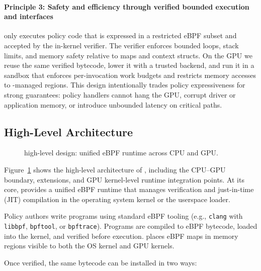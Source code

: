 \paragraph{Principle 3: Safety and efficiency through verified bounded execution and interfaces}
\sys only executes policy code that is expressed in a restricted eBPF subset and accepted by the in-kernel verifier. The verifier enforces bounded loops, stack limits, and memory safety relative to maps and context structs. On the GPU we reuse the same verified bytecode, lower it with a trusted backend, and run it in a sandbox that enforces per-invocation work budgets and restricts memory accesses to \sys-managed regions. This design intentionally trades policy expressiveness for strong guarantees: policy handlers cannot hang the GPU, corrupt driver or application memory, or introduce unbounded latency on critical paths.

\subsection{High-Level Architecture}
\label{sec:arch}

\begin{figure}
\centering
{}
\vspace{-.5ex}
\caption{\sys high-level design: unified eBPF runtime across CPU and GPU.}
\label{fig:system-design}
\end{figure}

Figure~\ref{fig:system-design} shows the high-level architecture of \sys, including the CPU--GPU boundary, \sysdriver extensions, and GPU kernel-level runtime integration points. At its core, \sys provides a unified eBPF runtime that manages verification and just-in-time (JIT) compilation in the operating system kernel or the userspace loader.

Policy authors write \sys programs using standard eBPF tooling (e.g., \texttt{clang} with \texttt{libbpf}, \texttt{bpftool}, or \texttt{bpftrace}). Programs are compiled to eBPF bytecode, loaded into the kernel, and verified before execution. \sys places eBPF maps in memory regions visible to both the OS kernel and GPU kernels.

Once verified, the same bytecode can be installed in two ways:

